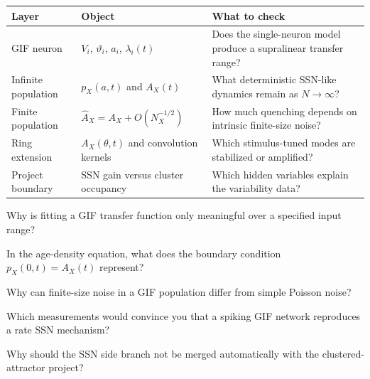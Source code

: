 \begin{chaptersummary}
\begin{center}
\renewcommand{\arraystretch}{1.5}
\begin{tabularx}{\textwidth}{@{}l X X@{}}
  \toprule
  \textbf{Layer} & \textbf{Object} & \textbf{What to check} \\
  \midrule
  GIF neuron &
  $V_i$, $\vartheta_i$, $a_i$, $\lambda_i(t)$ &
  Does the single-neuron model produce a supralinear transfer range? \\
  Infinite population &
  $p_X(a,t)$ and $A_X(t)$ &
  What deterministic SSN-like dynamics remain as $N\to\infty$? \\
  Finite population &
  $\widehat A_X=A_X+O(N_X^{-1/2})$ &
  How much quenching depends on intrinsic finite-size noise? \\
  Ring extension &
  $A_X(\theta,t)$ and convolution kernels &
  Which stimulus-tuned modes are stabilized or amplified? \\
  Project boundary &
  SSN gain versus cluster occupancy &
  Which hidden variables explain the variability data? \\
  \bottomrule
\end{tabularx}
\end{center}
\end{chaptersummary}

\begin{conceptquestions}
  \item Why is fitting a GIF transfer function only meaningful over a specified input range?
  \item In the age-density equation, what does the boundary condition $p_X(0,t)=A_X(t)$ represent?
  \item Why can finite-size noise in a GIF population differ from simple Poisson noise?
  \item Which measurements would convince you that a spiking GIF network reproduces a rate SSN mechanism?
  \item Why should the SSN side branch not be merged automatically with the clustered-attractor project?
\end{conceptquestions}
